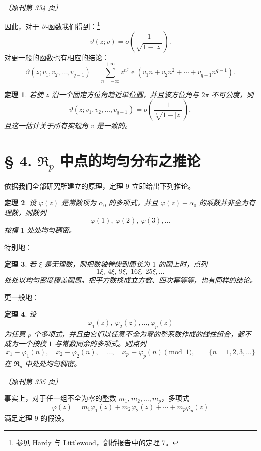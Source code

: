 \documentclass[UTF8,11pt,a4paper,fontset=none]{ctexart}
\theoremstyle{weylthm}
\newtheorem{theorem}{定理}
\newcommand{\e}{\operatorname{e}}
\newcommand{\origpage}[1]{%
  \par\vspace{0.7em}\noindent\hfill{\small\itshape〔原刊第 #1 页〕}\par\vspace{0.25em}}
\begin{document}
\origpage{334}

因此，对于 \(\vartheta\)-函数我们得到：\footnote{参见 Hardy 与 Littlewood，剑桥报告中的定理 7。}
\[
  \vartheta(z;v)=o\!\left(\frac{1}{\sqrt{1-|z|}}\right).
\]
对更一般的函数也有相应的结论：
\[
  \vartheta(z;v_1,v_2,\ldots,v_{q-1})
  =\sum_{n=-\infty}^{+\infty}
    z^{n^q}\e(v_1n+v_2n^2+\cdots+v_{q-1}n^{q-1}).
\]

\begin{theorem}
若使 \(z\) 沿一个固定方位角趋近单位圆，并且该方位角与 \(2\pi\) 不可公度，则
\[
  \vartheta(z;v_1,v_2,\ldots,v_{q-1})
  =o\!\left(\frac{1}{\sqrt[q]{1-|z|}}\right),
\]
且这一估计关于所有实辐角 \(v\) 是一致的。
\end{theorem}

\section*{§ 4. \(\mathfrak R_p\) 中点的均匀分布之推论}

依据我们全部研究所建立的原理，定理 9 立即给出下列推论。

\begin{theorem}
设 \(\varphi(z)\) 是常数项为 \(\alpha_0\) 的多项式，并且
\(\varphi(z)-\alpha_0\) 的系数并非全为有理数，则数列
\[
  \varphi(1),\ \varphi(2),\ \varphi(3),\ldots
\]
按模 \(1\) 处处均匀稠密。
\end{theorem}

特别地：

\begin{theorem}
若 \(\xi\) 是无理数，则把数轴卷绕到周长为 \(1\) 的圆上时，点列
\[
  1\xi,\ 4\xi,\ 9\xi,\ 16\xi,\ 25\xi,\ldots
\]
处处以均匀密度覆盖圆周。把平方数换成立方数、四次幂等等，也有同样的结论。
\end{theorem}

更一般地：

\begin{theorem}
设
\[
  \varphi_1(z),\ \varphi_2(z),\ldots,\varphi_p(z)
\]
为任意 \(p\) 个多项式，并且由它们以任意不全为零的整系数作成的线性组合，都不成为一个按模 \(1\) 与常数同余的多项式。则点列
\[
  x_1\equiv\varphi_1(n),\quad
  x_2\equiv\varphi_2(n),\quad\ldots,\quad
  x_p\equiv\varphi_p(n)\pmod 1,
  \qquad \{n=1,2,3,\ldots\}
\]
在 \(\mathfrak R_p\) 中处处均匀稠密。
\end{theorem}

\origpage{335}

事实上，对于任一组不全为零的整数
\(m_1,m_2,\ldots,m_p\)，多项式
\[
  \varphi(z)=m_1\varphi_1(z)+m_2\varphi_2(z)+\cdots+m_p\varphi_p(z)
\]
满足定理 9 的假设。
\end{document}
